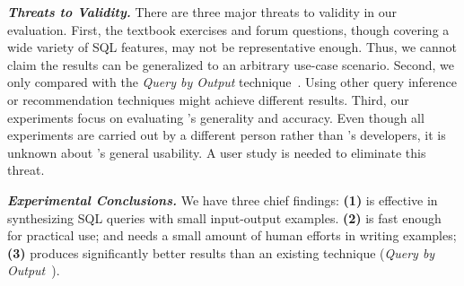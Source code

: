 \vspace{1mm}
\noindent \textbf{\textit{Threats to Validity.}}
There are three major threats to validity
in our evaluation. First, the \exnum textbook exercises
and \pnum forum questions, though covering
a wide variety of SQL features, may not be representative enough.
Thus, we cannot claim the results can be generalized to an
arbitrary use-case scenario. Second, we only compared
\ourtool with the \textit{Query by Output} technique~\cite{Tran:2009}.
Using other query inference or recommendation techniques
might achieve different results. Third, our
experiments focus on evaluating \ourtool's generality 
and accuracy. Even though all experiments are carried
out by a different person rather than \ourtool's developers,
it is unknown about \ourtool's general usability.
A user study is needed to eliminate this threat.


\vspace{1mm}
\noindent \textbf{\textit{Experimental Conclusions.}}
We have three chief findings: \textbf{(1)}
\ourtool is effective in synthesizing SQL queries
with small input-output examples.
\textbf{(2)} \ourtool is fast enough for practical use;
and needs a small amount of human
efforts in writing examples;
\textbf{(3)} \ourtool produces significantly better results
than an existing technique (\textit{Query by Output}~\cite{Tran:2009}).




